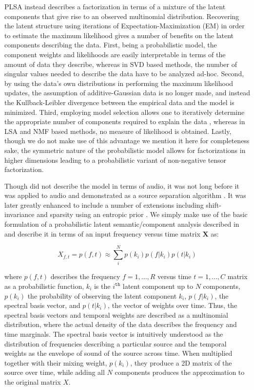 \documentclass[a4paper,11pt,final]{ThesisStyle}
\begin{document}
PLSA instead describes a factorization in terms of a mixture of the latent components that give rise to an observed multinomial distribution.  Recovering the latent structure using iterations of Expectation-Maximization (EM) in order to estimate the maximum likelihood gives a number of benefits on the latent components describing the data.  First, being a probabilistic model, the component weights and likelihoods are easily interpretable in terms of the amount of data they describe, whereas in SVD based methods, the number of singular values needed to describe the data have to be analyzed ad-hoc.  Second, by using the data's own distributions in performing the maximum likelihood updates, the assumption of additive-Gaussian data is no longer made, and instead the Kullback-Leibler divergence between the empirical data and the model is minimized.  Third, employing model selection allows one to iteratively determine the appropriate number of components required to explain the data \cite{Mital2012b}, whereas in LSA and NMF based methods, no measure of likelihood is obtained.  Lastly, though we do not make use of this advantage we mention it here for completeness sake, the symmetric nature of the probabilistic model allows for factorizations in higher dimensions leading to a probabilistic variant of non-negative tensor factorization.

Though \cite{Hofmann1999,Hofmann2001} did not describe the model in terms of audio, it was not long before it was applied to audio and demonstrated as a source separation algorithm \cite{SmaragdisRajShashanka}.  It was later greatly enhanced to include a number of extensions including shift-invariance and sparsity using an entropic prior \cite{Smaragdis2007}.  We simply make use of the basic formulation of a probabilistic latent semantic/component analysis described in \cite{Hofmann1999,SmaragdisRajShashanka} and describe it in terms of an input frequency versus time matrix $\mathbf{X}$ as:

\begin{equation}\label{eq:plca}
X_{f,t} = p(f,t) \approx \sum\limits_{i}^{N}p(k_i)p(f|k_i)p(t|k_i)  
\end{equation}

where $p(f,t)$ describes the frequency $f = {1,...,R}$ versus time $t = {1,...,C}$ matrix as a probabilistic function, $k_i$ is the $i^{\mathtt{th}}$ latent component up to $N$ components, $p(k_i)$ the probability of observing the latent component $k_i$, $p(f|k_i)$, the spectral basis vector, and $p(t|k_i)$, the vector of weights over time.  Thus, the spectral basis vectors and temporal weights are described as a multinomial distribution, where the actual density of the data describes the frequency and time marginals.  The spectral basis vector is intuitively understood as the distribution of frequencies describing a particular source and the temporal weights as the envelope of sound of the source across time.  When multiplied together with their mixing weight, $p(k_i)$, they produce a 2D matrix of the source over time, while adding all $N$ components produces the approximation to the original matrix $X$.  
\end{document}
